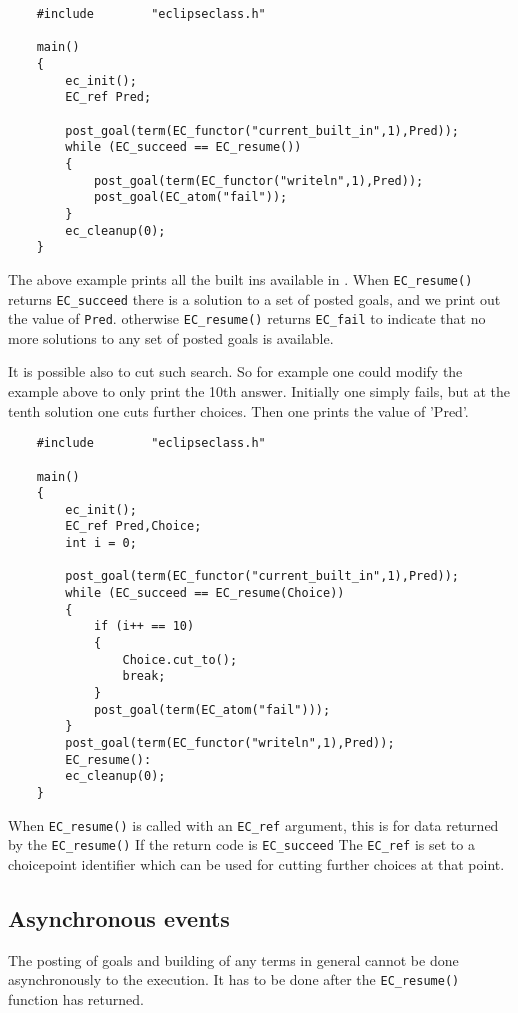 \begin{verbatim}
    #include        "eclipseclass.h"

    main()
    {
        ec_init();
        EC_ref Pred;

        post_goal(term(EC_functor("current_built_in",1),Pred));
        while (EC_succeed == EC_resume())
        {
            post_goal(term(EC_functor("writeln",1),Pred));
            post_goal(EC_atom("fail"));
        }
        ec_cleanup(0);
    }
\end{verbatim}
The above example prints all the built ins available in {\eclipse}.
When \verb.EC_resume(). returns \verb.EC_succeed. there is a solution
to a set of posted goals, and we print out the value of \verb.Pred..
otherwise \verb.EC_resume(). returns \verb.EC_fail. to indicate
that no more solutions to any set of posted goals is available.

It is possible also to cut such search. So for example one could modify
the example above to only print the 10th answer. Initially one simply
fails, but at the tenth solution one cuts further choices. Then
one prints the value of 'Pred'.

\begin{verbatim}
    #include        "eclipseclass.h"

    main()
    {
        ec_init();
        EC_ref Pred,Choice;
        int i = 0;

        post_goal(term(EC_functor("current_built_in",1),Pred));
        while (EC_succeed == EC_resume(Choice))
        {
            if (i++ == 10)
            {
                Choice.cut_to();
                break;
            }
            post_goal(term(EC_atom("fail")));
        }
        post_goal(term(EC_functor("writeln",1),Pred));
        EC_resume():
        ec_cleanup(0);
    }
\end{verbatim}

When \verb.EC_resume(). is called with an \verb.EC_ref. argument, this
is for data returned by the \verb.EC_resume(). If the return code is
\verb.EC_succeed. The \verb.EC_ref. is set to a choicepoint identifier
which can be used for cutting further choices at that point.

\subsection{Asynchronous events}

The posting of goals and building of any {\eclipse} terms in general
cannot be done asynchronously to the {\eclipse} execution. It has to
be done after the \verb.EC_resume(). function has returned.

